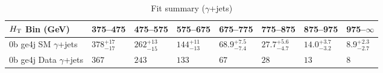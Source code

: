 \documentclass[8pt]{article}
\def\scalht{\mbox{$H_{\rm{T}}$}\xspace}
\newcommand\T{\rule{0pt}{2.6ex}}
\begin{document}
\begin{table}[ht!]
\caption{Fit summary ($\gamma$+jets)}
\label{tab:ensemble-summary}
\centering
\begin{tabular}{ llllllll }

\hline
\scalht Bin (GeV)       & 375--475                       & 475--575                       & 575--675                       & 675--775                       & 775--875                       & 875--975                       & 975--$\infty$                  \\ [1.000000ex]
\hline
0b ge4j SM $\gamma$+jets\T & $378^{+17}_{-17}$              & $262^{+13}_{-15}$              & $144^{+11}_{-13}$              & $68.9^{+7.5}_{-7.4}$           & $27.7^{+5.6}_{-4.7}$           & $14.0^{+3.7}_{-3.2}$           & $8.9^{+2.3}_{-2.7}$            \\ 
0b ge4j Data $\gamma$+jets\T & $367$                          & $243$                          & $133$                          & $67$                           & $28$                           & $13$                           & $8$                            \\ 
\hline

\end{tabular}
\end{table}
\end{document}
